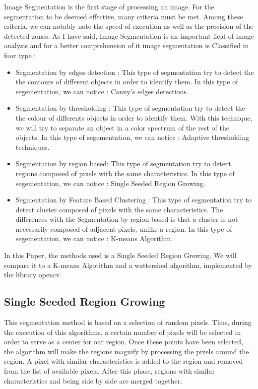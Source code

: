 \documentclass[conference]{IEEEtran}
\begin{document}
Image Segmentation is the first stage of processing an image. For the segmentation to be deemed effective, many criteria must be met. Among these criteria, we can notably note the speed of execution as well as the precision of the detected zones.  As I have said, Image Segmentation is an important field of image analysis and for a better comprehension of it  image segmentation is Classified in foor type :

\begin{itemize}
\item Segmentation by edges detection : This type of  segmentation try to detect the the contours of different objects in order to identify them. In this type of segementation, we can notice : Canny's edges detections.
\item Segmentation by thresholding : This type of  segmentation try to detect the the colour of differents objects in order to identify them. With this technique, we will try to separate an object in a color spectrum of the rest of the objects. In this type of segementation, we can notice : Adaptive thresholding techniques.
\item Segmentation by  region based: This type of segmentation try to detect regions composed of pixels  with the same characteristics. In this type of segementation, we can notice :  Single Seeded Region Growing.
\item Segmentation by Feature Based Clustering : This type of segmentation try to detect cluster composed of pixels  with the same characteristics. The differences with the Segmentation by region based  is that a cluster is not necessarily composed of adjacent pixels, unlike a region. In this type of segementation, we can notice :  K-means Algorithm.
\end{itemize}

In this Paper, the methods used is a Single Seeded Region Growing. We will compare it to a K-means Algotithm and a wattershed algorithm, implemented by the library opencv.

\subsection{Single Seeded Region Growing}

This segmentation method is based on a selection of random pixels. Thus, during the execution of this algorithms, a certain number of pixels will be selected in order to serve as a center for our region. Once these points have been selected, the algorithm will make the regions magnify by processing the pixels around the region. A pixel with similar characteristics is added to the region and removed from the list of available pixels.  After this phase, regions with similar characteristics and being side by side are merged together.
\end{document}
